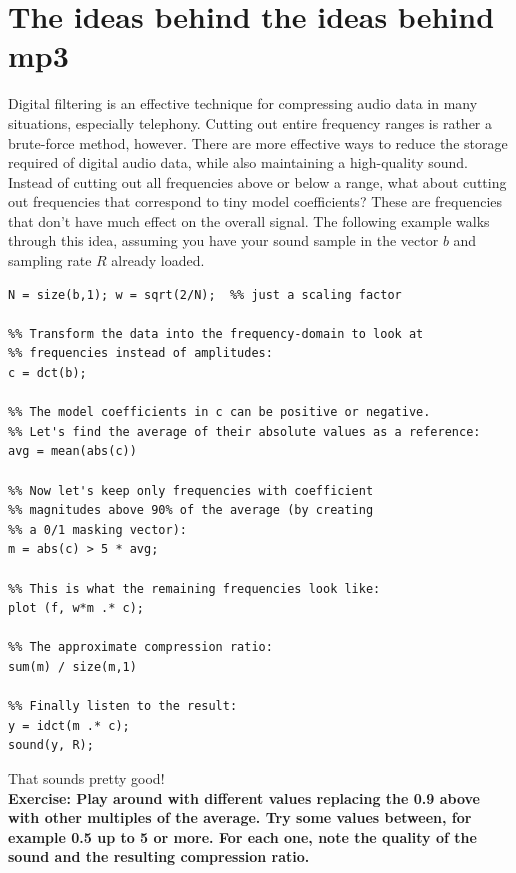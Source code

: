 \documentclass[10pt]{article}
\begin{document}
\break
\section*{The ideas behind the ideas behind mp3}
Digital filtering is an effective technique for compressing audio
data in many situations, especially telephony. Cutting out entire
frequency ranges is rather a brute-force method, however. There are
more effective ways to reduce the storage required of digital audio
data, while also maintaining a high-quality sound.\\

Instead of cutting out all frequencies above or below a range,
what about cutting out frequencies that correspond to tiny
model coefficients? These are frequencies that don't have
much effect on the overall signal. The following example walks
through this idea, assuming you have your sound sample in
the vector $b$ and sampling rate $R$ already loaded.

\begin{verbatim}
N = size(b,1); w = sqrt(2/N);  %% just a scaling factor

%% Transform the data into the frequency-domain to look at
%% frequencies instead of amplitudes:
c = dct(b);

%% The model coefficients in c can be positive or negative.
%% Let's find the average of their absolute values as a reference:
avg = mean(abs(c))

%% Now let's keep only frequencies with coefficient
%% magnitudes above 90% of the average (by creating
%% a 0/1 masking vector):
m = abs(c) > 5 * avg;

%% This is what the remaining frequencies look like:
plot (f, w*m .* c);

%% The approximate compression ratio:
sum(m) / size(m,1)

%% Finally listen to the result:
y = idct(m .* c);
sound(y, R);
\end{verbatim}
That sounds pretty good!\\

{\bf Exercise: Play around with different values replacing the 0.9
above with other multiples of the average. Try some values between, for
example 0.5 up to 5 or more. For each one, note the quality
of the sound and the resulting compression ratio.}
\end{document}
